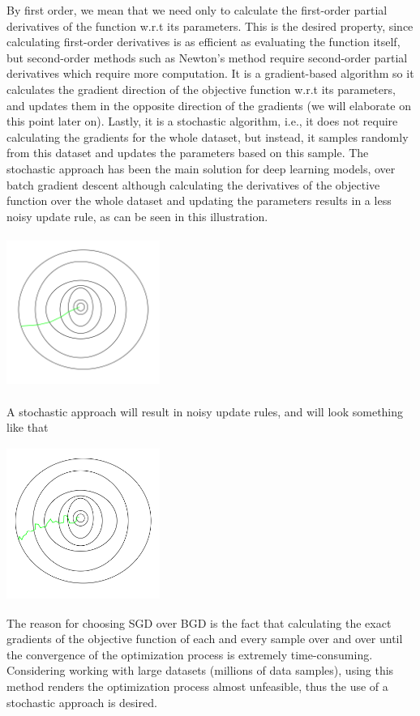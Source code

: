\documentclass[10pt,a4paper]{article}
\begin{document}
By first order, we mean that we need only to calculate the first-order partial derivatives of the function w.r.t its parameters. This is the desired property, since calculating first-order derivatives is as efficient as evaluating the function itself, but second-order methods such as Newton's method require second-order partial derivatives which require more computation. It is a gradient-based algorithm so it calculates the gradient direction of the objective function w.r.t its parameters, and updates them in the opposite direction of the gradients (we will elaborate on this point later on). Lastly, it is a stochastic algorithm, i.e., it does not require calculating the gradients for the whole dataset, but instead, it samples randomly from this dataset and updates the parameters based on this sample. The stochastic approach has been the main solution for deep learning models, over batch gradient descent although calculating the derivatives of the objective function over the whole dataset and updating the parameters results in a less noisy update rule, as can be seen in this illustration.\\
\begin{center}
\includegraphics[width=5cm, height=5cm]{BGD.png}
\end{center}
A stochastic approach will result in noisy update rules, and will look something like that\\
\begin{center}

    \includegraphics[width=5cm, height=5cm]{SGD.jpg}
\end{center}
The reason for choosing SGD over BGD is the fact that calculating the exact gradients of the objective function of each and every sample over and over until the convergence of the optimization process is extremely time-consuming.
Considering working with large datasets (millions of data samples), using this method renders the optimization process almost unfeasible, thus the use of a stochastic approach is desired.
\end{document}
